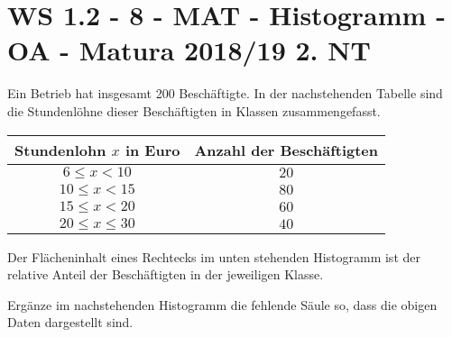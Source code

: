 \section{WS 1.2 - 8 - MAT - Histogramm - OA - Matura 2018/19 2. NT}

\begin{beispiel}[WS 1.2]{1}
Ein Betrieb hat insgesamt 200 Beschäftigte. In der nachstehenden Tabelle sind die Stundenlöhne dieser Beschäftigten in Klassen zusammengefasst.

\begin{center}
\begin{tabular}{|c|c|}\hline
\cellcolor[gray]{0.9}Stundenlohn $x$ in Euro&\cellcolor[gray]{0.9}Anzahl der Beschäftigten\\ \hline
$6\leq x<10$&$20$\\ \hline
$10\leq x<15$&$80$\\ \hline
$15\leq x<20$&$60$\\ \hline
$20\leq x\leq 30$&$40$\\ \hline
\end{tabular}
\end{center}

Der Flächeninhalt eines Rechtecks im unten stehenden Histogramm ist der relative Anteil der Beschäftigten in der jeweiligen Klasse.

Ergänze im nachstehenden Histogramm die fehlende Säule so, dass die obigen Daten dargestellt sind.


\end{beispiel}
